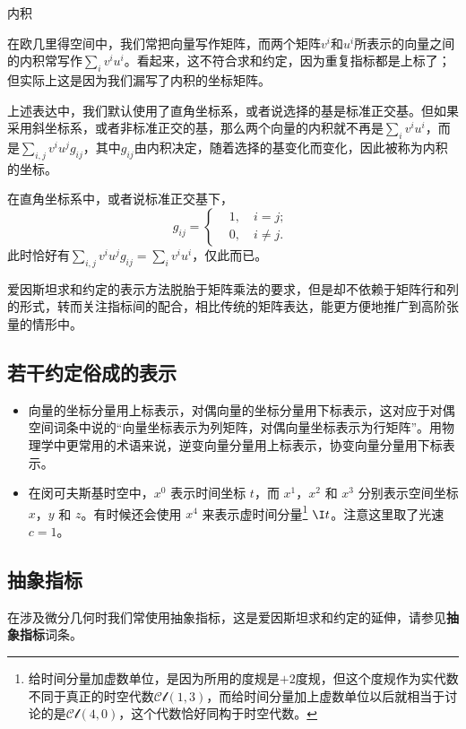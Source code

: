 \begin{example}{内积}

在欧几里得空间中，我们常把向量写作矩阵，而两个矩阵$v^i$和$u^i$所表示的向量之间的内积常写作$\sum_i v^iu^i$。看起来，这不符合求和约定，因为重复指标都是上标了；但实际上这是因为我们漏写了内积的坐标矩阵。

上述表达中，我们默认使用了直角坐标系，或者说选择的基是标准正交基。但如果采用斜坐标系，或者非标准正交的基，那么两个向量的内积就不再是$\sum_i v^iu^i$，而是$\sum_{i, j} v^iu^j g_{ij}$，其中$g_{ij}$由内积决定，随着选择的基变化而变化，因此被称为内积的坐标。

在直角坐标系中，或者说标准正交基下，
\begin{equation}
g_{ij}=
\left\{
    \begin{aligned}
    &1, \quad i=j;\\
    &0, \quad i\not= j. 
    \end{aligned}
\right. ~
\end{equation}
此时恰好有$\sum_{i, j} v^iu^j g_{ij}=\sum_i v^iu^i$，仅此而已。

\end{example}



爱因斯坦求和约定的表示方法脱胎于矩阵乘法的要求，但是却不依赖于矩阵行和列的形式，转而关注指标间的配合，相比传统的矩阵表达，能更方便地推广到高阶张量的情形中。


\subsection{若干约定俗成的表示}
\begin{itemize}
\item 向量的坐标分量用上标表示，对偶向量的坐标分量用下标表示，这对应于对偶空间词条中说的“向量坐标表示为列矩阵，对偶向量坐标表示为行矩阵”。用物理学中更常用的术语来说，逆变向量分量用上标表示，协变向量分量用下标表示。

\item 在闵可夫斯基时空中，$x^0$ 表示时间坐标 $t$，而 $x^1$，$x^2$ 和 $x^3$ 分别表示空间坐标 $x$，$y$ 和 $z$。有时候还会使用 $x^4$ 来表示虚时间分量\footnote{给时间分量加虚数单位，是因为所用的度规是$+2$度规，但这个度规作为实代数不同于真正的时空代数$\mathcal{Cl}(1, 3)$，而给时间分量加上虚数单位以后就相当于讨论的是$\mathcal{Cl}(4, 0)$，这个代数恰好同构于时空代数。} $\I t$。注意这里取了光速 $c=1$。




\end{itemize}







\subsection{抽象指标}

在涉及微分几何时我们常使用抽象指标，这是爱因斯坦求和约定的延伸，请参见\textbf{抽象指标}词条。




